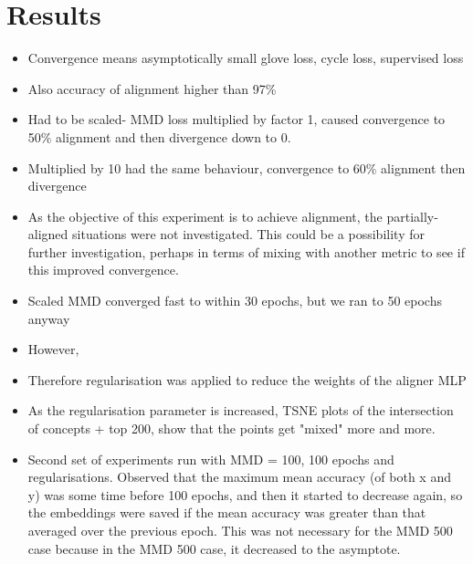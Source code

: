 \section{Results}
\begin{itemize}
    \item Convergence means asymptotically small glove loss, cycle loss, supervised loss
    \item Also accuracy of alignment higher than 97\%
    \item Had to be scaled- MMD loss multiplied by factor 1, caused convergence to 50\% alignment and then divergence down to 0.
    \item Multiplied by 10 had the same behaviour, convergence to 60\% alignment then divergence
    \item As the objective of this experiment is to achieve alignment, the partially-aligned situations were not investigated. This could be a possibility for further investigation, perhaps in terms of mixing with another metric to see if this improved convergence. 
    \item Scaled MMD converged fast to within 30 epochs, but we ran to 50 epochs anyway
    \item However, 
    \item Therefore regularisation was applied to reduce the weights of the aligner MLP 
    \item As the regularisation parameter is increased, TSNE plots of the intersection of concepts + top 200, show that the points get "mixed" more and more. 
    \item Second set of experiments run with MMD = 100, 100 epochs and regularisations. Observed that the maximum mean accuracy (of both x and y) was some time before 100 epochs, and then it started to decrease again, so the embeddings were saved if the mean accuracy was greater than that averaged over the previous epoch. This was not necessary for the MMD 500 case because in the MMD 500 case, it decreased to the asymptote. 
\end{itemize}